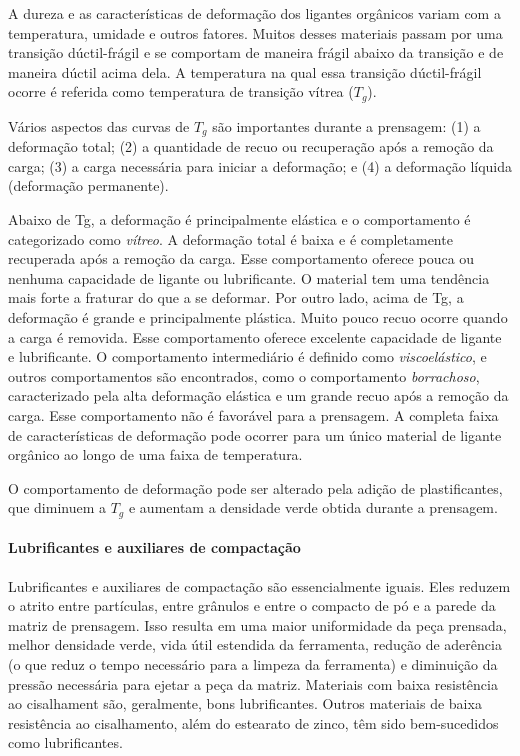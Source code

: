 A dureza e as características de deformação dos ligantes orgânicos variam com a temperatura, umidade e outros fatores. Muitos desses materiais passam por uma transição dúctil-frágil e se comportam de maneira frágil abaixo da transição e de maneira dúctil acima dela. A temperatura na qual essa transição dúctil-frágil ocorre é referida como temperatura de transição vítrea ($T_g$).

Vários aspectos das curvas de $T_g$ são importantes durante a prensagem: (1) a deformação total; (2) a quantidade de recuo ou recuperação após a remoção da carga; (3) a carga necessária para iniciar a deformação; e (4) a deformação líquida (deformação permanente).

Abaixo de Tg, a deformação é principalmente elástica e o comportamento é categorizado como \textit{vítreo}. A deformação total é baixa e é completamente recuperada após a remoção da carga. Esse comportamento oferece pouca ou nenhuma capacidade de ligante ou lubrificante. O material tem uma tendência mais forte a fraturar do que a se deformar. Por outro lado, acima de Tg, a deformação é grande e principalmente plástica. Muito pouco recuo ocorre quando a carga é removida. Esse comportamento oferece excelente capacidade de ligante e lubrificante. O comportamento intermediário é definido como \textit{viscoelástico}, e outros comportamentos são encontrados, como o comportamento \textit{borrachoso}, caracterizado pela alta deformação elástica e um grande recuo após a remoção da carga. Esse comportamento não é favorável para a prensagem. A completa faixa de características de deformação pode ocorrer para um único material de ligante orgânico ao longo de uma faixa de temperatura.


O comportamento de deformação pode ser alterado pela adição de plastificantes, que diminuem a $T_g$ e aumentam a densidade verde obtida durante a prensagem.

\paragraph*{Lubrificantes e auxiliares de compactação}

Lubrificantes e auxiliares de compactação são essencialmente iguais. Eles reduzem o atrito entre partículas, entre grânulos e entre o compacto de pó e a parede da matriz de prensagem. Isso resulta em uma maior uniformidade da peça prensada, melhor densidade verde, vida útil estendida da ferramenta, redução de aderência (o que reduz o tempo necessário para a limpeza da ferramenta) e diminuição da pressão necessária para ejetar a peça da matriz. Materiais com baixa resistência ao cisalhament são, geralmente, bons lubrificantes. Outros materiais de baixa resistência ao cisalhamento, além do estearato de zinco, têm sido bem-sucedidos como lubrificantes.

